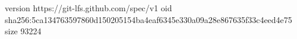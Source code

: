 version https://git-lfs.github.com/spec/v1
oid sha256:5ca134763597860d150205154ba4eaf6345e330a09a28e867635f33c4eed4e75
size 93224
